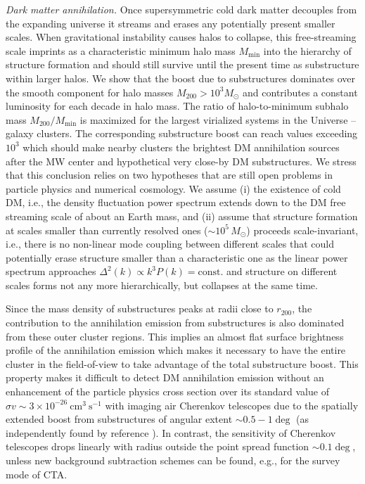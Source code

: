 \documentclass[10pt,aps,pra,reprint,amsmath,amsfonts,amssymb,showpacs,nofootinbib,floatfix]{revtex4-1}
\newcommand{\rmn}{\mathrm}
\newcommand{\msun}{M_\odot}
\newcommand{\rvir}{r_{200}}
\newcommand{\mvir}{M_{200}}
\begin{document}
{\em Dark matter annihilation.} Once supersymmetric cold dark matter
decouples from the expanding universe it streams and erases any
potentially present smaller scales. When gravitational instability
causes halos to collapse, this free-streaming scale imprints as a
characteristic minimum halo mass $M_\mathrm{min}$ into the hierarchy
of structure formation and should still survive until the present time
as substructure within larger halos. We show that the boost due to
substructures dominates over the smooth component for halo masses
$\mvir>10^3 \msun$ and contributes a constant luminosity for each
decade in halo mass. The ratio of halo-to-minimum subhalo mass
$\mvir/M_\mathrm{min}$ is maximized for the largest virialized systems
in the Universe -- galaxy clusters. The corresponding substructure
boost can reach values exceeding $10^3$ which should make nearby
clusters the brightest DM annihilation sources after the MW center and
hypothetical very close-by DM substructures. We stress that this
conclusion relies on two hypotheses that are still open problems in
particle physics and numerical cosmology. We assume (i) the existence
of cold DM, i.e., the density fluctuation power spectrum extends down
to the DM free streaming scale of about an Earth mass, and (ii) assume
that structure formation at scales smaller than currently resolved
ones ($\sim 10^5\,\msun$) proceeds scale-invariant, i.e., there is no
non-linear mode coupling between different scales that could
potentially erase structure smaller than a characteristic one as the
linear power spectrum approaches $\Delta^2(k) \propto k^3
P(k)=\rmn{const.}$ and structure on different scales forms not any
more hierarchically, but collapses at the same time.

Since the mass density of substructures peaks at radii close to
$\rvir$, the contribution to the annihilation emission from
substructures is also dominated from these outer cluster regions.
This implies an almost flat surface brightness profile of the
annihilation emission which makes it necessary to have the entire
cluster in the field-of-view to take advantage of the total
substructure boost. This property makes it difficult to detect DM
annihilation emission without an enhancement of the particle physics
cross section over its standard value of $\sigma v\sim 3\times
10^{-26} ~\mathrm{cm}^3~\mathrm{s}^{-1}$ with imaging air Cherenkov
telescopes due to the spatially extended boost from substructures of
angular extent $\sim 0.5-1\deg$ (as independently found by reference
\cite{2011arXiv1104.3530S}). In contrast, the sensitivity of Cherenkov
telescopes drops linearly with radius outside the point spread
function $\sim 0.1\deg$, unless new background subtraction schemes can
be found, e.g., for the survey mode of CTA.
\end{document}
